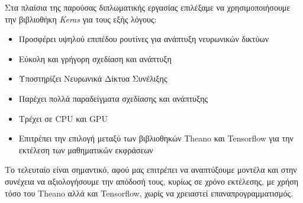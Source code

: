 Στα πλαίσια της παρούσας διπλωματικής εργασίας επιλέξαμε να χρησιμοποιήσουμε
την βιβλιοθήκη \emph{Keras} για τους εξής λόγους:
\begin{itemize}
  \item{Προσφέρει υψηλού επιπέδου ρουτίνες για ανάπτυξη νευρωνικών δικτύων}
  \item{Εύκολη και γρήγορη σχεδίαση και ανάπτυξη}
  \item{Υποστηρίζει Νευρωνικά Δίκτυα Συνέλιξης}
  \item{Παρέχει πολλά παραδείγματα σχεδίασης και ανάπτυξης}
  \item{Τρέχει σε CPU και GPU}
  \item{Επιτρέπει την επιλογή μεταξύ των βιβλιοθηκών Theano και Tensorflow
    για την εκτέλεση των μαθηματικών εκφράσεων}
\end{itemize}

Το τελευταίο είναι σημαντικό, αφού μας επιτρέπει να αναπτύξουμε μοντέλα
και στην συνέχεια να αξιολογήσουμε την απόδοσή τους, κυρίως σε χρόνο εκτέλεσης,
με χρήση τόσο του Theano αλλά και Tensorflow, χωρίς να χρειαστεί
επαναπρογραμματισμός.
